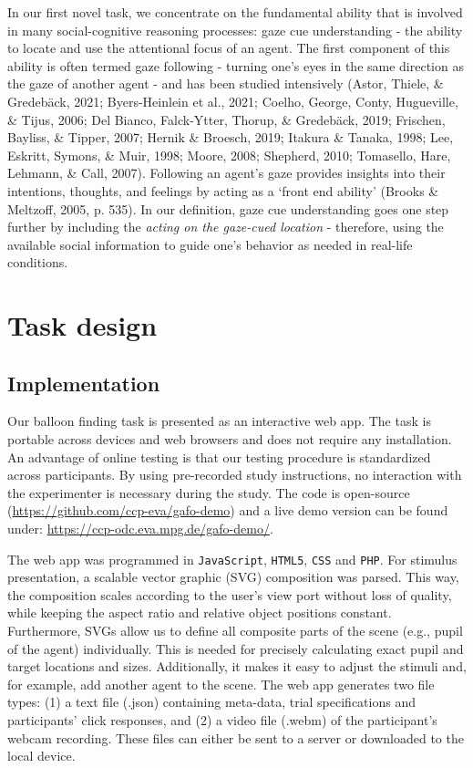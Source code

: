 \documentclass[
  man,floatsintext]{apa6}
\begin{document}
In our first novel task, we concentrate on the fundamental ability that is involved in many social-cognitive reasoning processes:
gaze cue understanding - the ability to locate and use the attentional focus of an agent.
The first component of this ability is often termed gaze following - turning one's eyes in the same direction as the gaze of another agent - and has been studied intensively (Astor, Thiele, \& Gredebäck, 2021; Byers-Heinlein et al., 2021; Coelho, George, Conty, Hugueville, \& Tijus, 2006; Del Bianco, Falck-Ytter, Thorup, \& Gredebäck, 2019; Frischen, Bayliss, \& Tipper, 2007; Hernik \& Broesch, 2019; Itakura \& Tanaka, 1998; Lee, Eskritt, Symons, \& Muir, 1998; Moore, 2008; Shepherd, 2010; Tomasello, Hare, Lehmann, \& Call, 2007).
Following an agent's gaze provides insights into their intentions, thoughts, and feelings by acting as a `front end ability' (Brooks \& Meltzoff, 2005, p. 535).
In our definition, gaze cue understanding goes one step further by including the \emph{acting on the gaze-cued location} - therefore, using the available social information to guide one's behavior as needed in real-life conditions.

\hypertarget{task-design}{%
\section{Task design}\label{task-design}}

\hypertarget{implementation}{%
\subsection{Implementation}\label{implementation}}

Our balloon finding task is presented as an interactive web app. The task is portable across devices and web browsers and does not require any installation. An advantage of online testing is that our testing procedure is standardized across participants. By using pre-recorded study instructions, no interaction with the experimenter is necessary during the study. The code is open-source (\url{https://github.com/ccp-eva/gafo-demo}) and a live demo version can be found under: \url{https://ccp-odc.eva.mpg.de/gafo-demo/}.

The web app was programmed in \texttt{JavaScript}, \texttt{HTML5}, \texttt{CSS} and \texttt{PHP}. For stimulus presentation, a scalable vector graphic (SVG) composition was parsed. This way, the composition scales according to the user's view port without loss of quality, while keeping the aspect ratio and relative object positions constant. Furthermore, SVGs allow us to define all composite parts of the scene (e.g., pupil of the agent) individually. This is needed for precisely calculating exact pupil and target locations and sizes. Additionally, it makes it easy to adjust the stimuli and, for example, add another agent to the scene. The web app generates two file types: (1) a text file (.json) containing meta-data, trial specifications and participants' click responses, and (2) a video file (.webm) of the participant's webcam recording. These files can either be sent to a server or downloaded to the local device.
\end{document}
